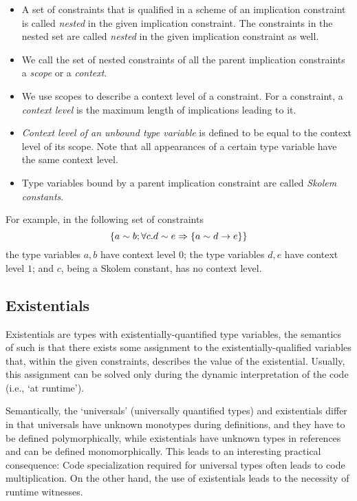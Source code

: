 \begin{defn}[Naming]
    \begin{itemize}
        \item A set of constraints that is qualified in a scheme of an implication constraint is called \emph{nested} in the given implication constraint. The constraints in the nested set are called \emph{nested} in the given implication constraint as well.

        \item We call the set of nested constraints of all the parent implication constraints a \emph{scope} or a \emph{context}.

        \item We use scopes to describe a context level of a constraint. For a constraint, a \emph{context level} is the maximum length of implications leading to it.

        \item \emph{Context level of an unbound type variable} is defined to be equal to the context level of its scope. Note that all appearances of a certain type variable have the same context level.

        \item Type variables bound by a parent implication constraint are called \emph{Skolem constants}.
    \end{itemize}
\end{defn}

For example, in the following set of constraints
\[ \left\{ a \sim b; \forall c. d \sim e \Rightarrow \left\{ a \sim d \to e \right\} \right\} \]
the type variables $a, b$ have context level $0$; the type variables $d, e$ have context level $1$; and $c$, being a Skolem constant, has no context level.

\subsection{Existentials}

\label{existentials}

Existentials are types with existentially-quantified type variables, the semantics of such is that there exists some assignment to the existentially-qualified variables that, within the given constraints, describes the value of the existential. Usually, this assignment can be solved only during the dynamic interpretation of the code (i.e., `at runtime').

Semantically, the `universals' (universally quantified types) and existentials differ in that universals have unknown monotypes during definitions, and they have to be defined polymorphically, while existentials have unknown types in references and can be defined monomorphically. This leads to an interesting practical consequence: Code specialization required for universal types often leads to code multiplication. On the other hand, the use of existentials leads to the necessity of runtime witnesses.

